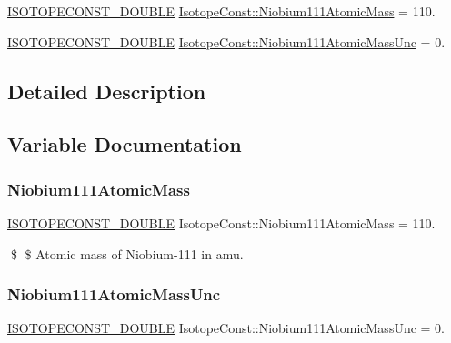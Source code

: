 \begin{DoxyCompactItemize}
\item 
\mbox{\hyperlink{group___isotope_const-_macros_ga8f45a7272ce02c0b4c65c44636ed719a}{I\+S\+O\+T\+O\+P\+E\+C\+O\+N\+S\+T\+\_\+\+D\+O\+U\+B\+LE}} \mbox{\hyperlink{group___isotope_const-_niobium-_nb111_ga71453033bc322118a6af45812765ca34}{Isotope\+Const\+::\+Niobium111\+Atomic\+Mass}} = 110.
\item 
\mbox{\hyperlink{group___isotope_const-_macros_ga8f45a7272ce02c0b4c65c44636ed719a}{I\+S\+O\+T\+O\+P\+E\+C\+O\+N\+S\+T\+\_\+\+D\+O\+U\+B\+LE}} \mbox{\hyperlink{group___isotope_const-_niobium-_nb111_ga5ff4861c20b9450805af6d788cd89437}{Isotope\+Const\+::\+Niobium111\+Atomic\+Mass\+Unc}} = 0.
\end{DoxyCompactItemize}


\subsection{Detailed Description}


\subsection{Variable Documentation}
\mbox{\label{group___isotope_const-_niobium-_nb111_ga71453033bc322118a6af45812765ca34}} 
\subsubsection{\texorpdfstring{Niobium111\+Atomic\+Mass}{Niobium111AtomicMass}}
{\footnotesize\ttfamily \mbox{\hyperlink{group___isotope_const-_macros_ga8f45a7272ce02c0b4c65c44636ed719a}{I\+S\+O\+T\+O\+P\+E\+C\+O\+N\+S\+T\+\_\+\+D\+O\+U\+B\+LE}} Isotope\+Const\+::\+Niobium111\+Atomic\+Mass = 110.}

\$ \$ Atomic mass of Niobium-\/111 in amu. \mbox{\label{group___isotope_const-_niobium-_nb111_ga5ff4861c20b9450805af6d788cd89437}} 
\subsubsection{\texorpdfstring{Niobium111\+Atomic\+Mass\+Unc}{Niobium111AtomicMassUnc}}
{\footnotesize\ttfamily \mbox{\hyperlink{group___isotope_const-_macros_ga8f45a7272ce02c0b4c65c44636ed719a}{I\+S\+O\+T\+O\+P\+E\+C\+O\+N\+S\+T\+\_\+\+D\+O\+U\+B\+LE}} Isotope\+Const\+::\+Niobium111\+Atomic\+Mass\+Unc = 0.}

